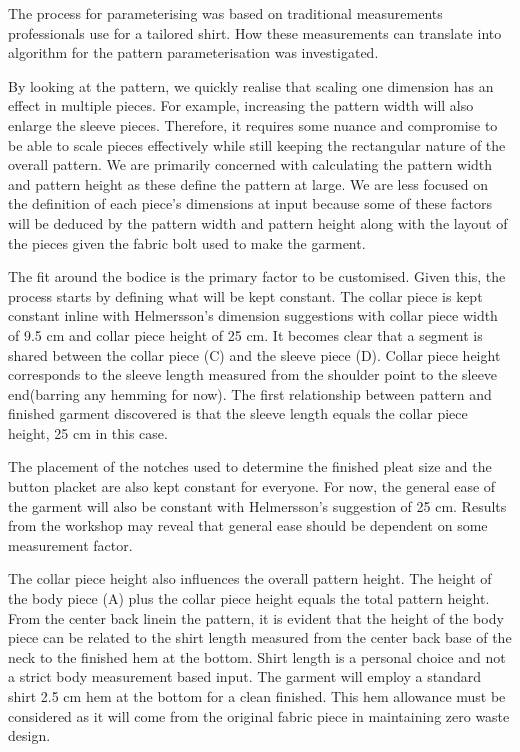 The process for parameterising was based on traditional measurements professionals use for a tailored shirt. How these measurements can translate into algorithm for the pattern parameterisation was investigated.

By looking at the pattern, we quickly realise that scaling one dimension has an effect in multiple pieces. For example, increasing the pattern width will also enlarge the sleeve pieces. Therefore, it requires some nuance and compromise to be able to scale pieces effectively while still keeping the rectangular nature of the overall pattern. We are primarily concerned with calculating the pattern width and pattern height as these define the pattern at large. We are less focused on the definition of each piece's dimensions at input because some of these factors will be deduced by the pattern width and pattern height along with the layout of the pieces given the fabric bolt used to make the garment.

The fit around the bodice is the primary factor to be customised. Given this, the process starts by defining what will be kept constant. The collar piece is kept constant inline with Helmersson's dimension suggestions with collar piece width of 9.5 cm and collar piece height of 25 cm. It becomes clear that a segment is shared between the collar piece (C) and the sleeve piece (D). Collar piece height corresponds to the sleeve length measured from the shoulder point to the sleeve end(barring any hemming for now). The first relationship between pattern and finished garment discovered is that the sleeve length equals the collar piece height, 25 cm in this case.

The placement of the notches used to determine the finished pleat size and the button placket are also kept constant for everyone. For now, the general ease of the garment will also be constant with Helmersson's suggestion of 25 cm. Results from the workshop may reveal that general ease should be dependent on some measurement factor.

The collar piece height also influences the overall pattern height. The height of the body piece (A) plus the collar piece height equals the total pattern height. From the center back linein the pattern, it is evident that the height of the body piece can be related to the shirt length measured from the center back base of the neck to the finished hem at the bottom. Shirt length is a personal choice and not a strict body measurement based input. The garment will employ a standard shirt 2.5 cm hem at the bottom for a clean finished. This hem allowance must be considered as it will come from the original fabric piece in maintaining zero waste design.

